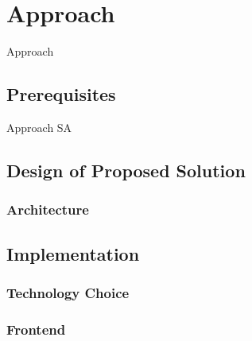 \chapter{Approach}\label{chapter:approach}
Approach

\section{Prerequisites}
Approach \gls{SA}

\section{Design of Proposed Solution}

\subsection{Architecture}


\section{Implementation}

\subsection{Technology Choice}

\subsection{Frontend}

